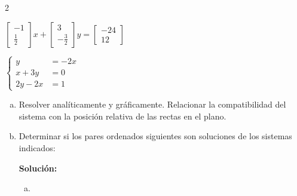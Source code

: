 \documentclass[11pt]{article}
\begin{document}
\begin{enumerate}[\hspace{-5mm} 1) ]
{\begin{enumerate}[i)]
\begin{multicols}{2}
\columnbreak %

        
        \item  $\begin{bmatrix} -1 \\ \tfrac{1}{2} \end{bmatrix}x 
        +
        \begin{bmatrix}3 \\ -\tfrac{3}{2} \end{bmatrix} y
        = \begin{bmatrix} -24 \\ 12 \end{bmatrix}$

\bigskip  
        
        \item $\left\{ \begin{array}{rl}
        y &= -2x \\
        x + 3y &= 0 \\
        2y - 2x &= 1
        \end{array}\right.$   
        
        \end{multicols}
    \end{enumerate} 
 }   
    
    \begin{enumerate}[a)]
    \item Resolver analíticamente y gráficamente. Relacionar la compatibilidad del sistema con la posición relativa de las rectas en el plano.

    
    \item  Determinar si los pares ordenados siguientes son soluciones de los sistemas indicados:
    \begin{itemize}
    \end{itemize}



\textbf{Solución:}


\begin{enumerate}[a)]
    \item \, \vspace{-6mm}
    

\end{enumerate}
\end{enumerate}
\end{enumerate}
\end{document}

